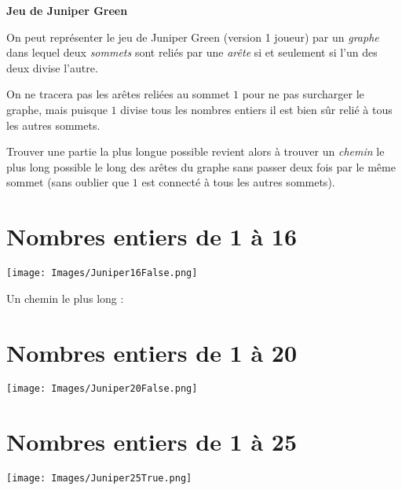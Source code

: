 \documentclass[11pt]{article}
\newcommand{\ligne}{{\color{gray!60}\hrulefill}}
\begin{document}
\begin{tcolorbox}[colback=teal!10!white, colframe=teal!80!black]
\begin{center}
\large\textbf{Jeu de Juniper Green {\emoji 🧗}}
\end{center}
\end{tcolorbox}

\vspace{1.5em}

On peut représenter le jeu de Juniper Green (version 1 joueur) par un \emph{graphe} dans lequel deux \emph{sommets} sont reliés par une \emph{arête} si et seulement si l’un des deux divise l’autre.

On ne tracera pas les arêtes reliées au sommet $1$ pour ne pas surcharger le graphe, mais puisque $1$ divise tous les nombres entiers il est bien sûr relié à tous les autres sommets. 

Trouver une partie la plus longue possible revient alors à trouver un \emph{chemin} le plus long possible le long des arêtes du graphe sans passer deux fois par le même sommet (sans oublier que $1$ est connecté à tous les autres sommets).

\section*{Nombres entiers de 1 à 16}

\begin{center}
\texttt{[image: Images/Juniper16False.png]}
\end{center}

Un chemin le plus long : \ligne

\newpage

\section*{Nombres entiers de 1 à 20}

\begin{center}
\texttt{[image: Images/Juniper20False.png]}
\end{center}

\ligne

\newpage

\section*{Nombres entiers de 1 à 25}

\begin{center}
\texttt{[image: Images/Juniper25True.png]}
\end{center}

\ligne
\end{document}
